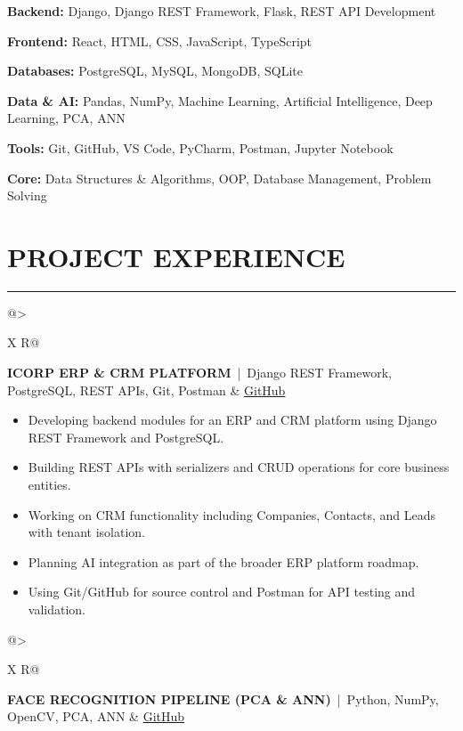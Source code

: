 \documentclass[a4paper,9pt]{article}
\makeatletter
\newcommand{\sectionline}{
    \vspace{0pt}
    \hrule
    \vspace{1.5pt}
}
\newcommand{\projectheading}[3]{
    \noindent
    \begin{tabularx}{\textwidth}{@{}>{\raggedright\arraybackslash}X R@{}}
        \textbf{#1} \,|\, #2
        &
        #3
    \end{tabularx}
    \vspace{-2pt}
}
\makeatother
\begin{document}
\textbf{Backend:}
Django, Django REST Framework, Flask, REST API Development

\textbf{Frontend:}
React, HTML, CSS, JavaScript, TypeScript

\textbf{Databases:}
PostgreSQL, MySQL, MongoDB, SQLite

\textbf{Data \& AI:}
Pandas, NumPy, Machine Learning, Artificial Intelligence, Deep Learning, PCA, ANN

\textbf{Tools:}
Git, GitHub, VS Code, PyCharm, Postman, Jupyter Notebook

\textbf{Core:}
Data Structures \& Algorithms, OOP, Database Management, Problem Solving


\section*{PROJECT EXPERIENCE}
\sectionline


\projectheading
{ICORP ERP \& CRM PLATFORM}
{Django REST Framework, PostgreSQL, REST APIs, Git, Postman}
{\href{https://github.com/shibinputhramannil/IcorpERP}{GitHub}}

\begin{itemize}
    \item Developing backend modules for an ERP and CRM platform using Django REST Framework and PostgreSQL.
    \item Building REST APIs with serializers and CRUD operations for core business entities.
    \item Working on CRM functionality including Companies, Contacts, and Leads with tenant isolation.
    \item Planning AI integration as part of the broader ERP platform roadmap.
    \item Using Git/GitHub for source control and Postman for API testing and validation.
\end{itemize}


\projectheading
{FACE RECOGNITION PIPELINE (PCA \& ANN)}
{Python, NumPy, OpenCV, PCA, ANN}
{\href{https://github.com/shibinputhramannil/Face_Recognition-PCA-ANN}{GitHub}}
\end{document}
